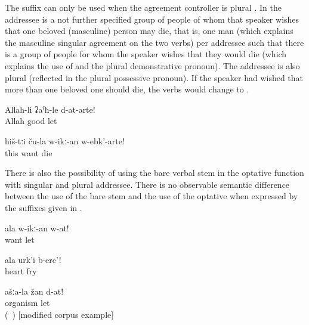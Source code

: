 The suffix  can only be used when the agreement controller is plural .  In  the addressee is a not further specified group of people of whom that speaker wishes that one beloved (masculine) person may die, that is, one man (which explains the masculine singular agreement on the two verbs) per addressee such that there is a group of people for whom the speaker wishes that they would die (which explains the use of  and the plural demonstrative pronoun). The addressee is also plural (reflected in the plural possessive pronoun). If the speaker had wished that more than one beloved one should die, the verbs would change to .
%
\begin{exe}
	\ex	\label{ex:‎‎‎May Allah leave you (plural) well}
	\gll	Allah-li	ʡaˁħ-le	d-at-arte!\\
		Allah	good	let\\
	\glt	{}

	\ex	\label{ex:‎May their beloved ones die}
	\gll	hiš-tːi	ču-la	w-ikː-an	w-ebk'-arte!\\
		this		want	die\\
	\glt	{}
\end{exe}

There is also the possibility of using the bare verbal stem in the optative function  with singular and plural addressee. There is no observable semantic difference between the use of the bare stem and the use of the optative when expressed by the suffixes given in .
%
\begin{exe}
	\ex	\label{ex:May your beloved (son) be left (in peace, alive)}
	\gll	ala	w-ikː-an	w-at!\\
			want	let\\
	\glt	{}

	\ex	\label{ex:May your heart char}
	\gll	ala	urk'i	b-erc'!\\
			heart	fry\\
	\glt	{}

	\ex	\label{ex:May your bodies and souls remain}
	\gll	ašːa-la	žan	d-at!\\
			organism	let\\
	\glt	{} (\tie\ ) [modified corpus example]
\end{exe}

